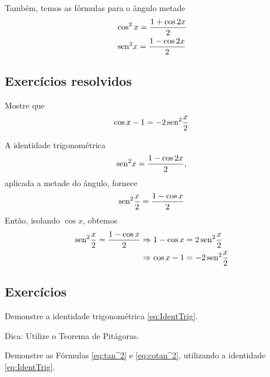 \documentclass[../main.tex]{subfiles}
\begin{document}
Também, temos as fórmulas para o ângulo metade
\begin{align}
  &\cos^2 x = \frac{1 + \cos 2x}{2}\label{eq:CosDuplo}\\
  &\operatorname{sen}\,\!\!^2 x = \frac{1 - \cos 2x}{2}\label{eq:SenDuplo}
\end{align}
\subsection{Exercícios resolvidos}
\begin{exeresol}
  Mostre que
  \begin{equation*}
    \cos x - 1 = -2\operatorname{sen}\,\!\!^2 \frac{x}{2}
  \end{equation*}
  \begin{resol}
  A identidade trigonométrica
  \begin{equation*}
    \operatorname{sen}\,\!\!^2 x = \frac{1 - \cos 2x}{2},
  \end{equation*}
  aplicada a metade do ângulo, fornece
  \begin{equation*}
    \operatorname{sen}\,\!\!^2 \frac{x}{2} = \frac{1 - \cos x}{2}
  \end{equation*}
  Então, isolando $\cos x$, obtemos
  \begin{align*}
    \operatorname{sen}\,\!\!^2 \frac{x}{2} = \frac{1 - \cos x}{2} &\Rightarrow 1 - \cos x = 2\operatorname{sen}\,\!\!^2 \frac{x}{2}\\
                                              &\Rightarrow \cos x - 1 = -2\operatorname{sen}\,\!\!^2 \frac{x}{2}
  \end{align*}
\end{resol}
\end{exeresol}

\subsection{Exercícios}
\begin{exer}
  Demonstre a identidade trigonométrica \ref{eq:IdentTrig}.
\end{exer}
\begin{resp}
  Dica: Utilize o Teorema de Pitágoras.
\end{resp}

\begin{exer}
  Demonstre as Fórmulas \ref{eq:tan^2} e \ref{eq:cotan^2}, utilizando a identidade \ref{eq:IdentTrig}.
  \end{exer}
\begin{resp}
\end{resp}
\end{document}
